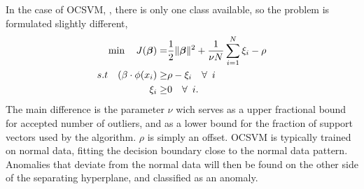             In the case of OCSVM, \cite{Scholkopf2001}, there is only one class available, so the problem is formulated slightly different,
            \begin{align}
                \min \quad J(\bm \beta) = & \frac{1}{2}\lVert\bm \beta\rVert^2  + \frac{1}{\nu N}\sum_{i=1}^N \xi_i - \rho \nonumber \\
                s.t \quad (\beta \cdot \phi(x_i) \geq & \rho - \xi_i \quad \forall \enspace i \nonumber \\
                \xi_i \geq & 0 \quad \forall \enspace i.
                \label{svm:cost_oc}
            \end{align}
            The main difference is the parameter $\nu$ wich serves as a upper fractional bound for accepted number of outliers, and as a lower bound for the fraction of support vectors used by the algorithm. $\rho$ is simply an offset. OCSVM is typically trained on normal data, fitting the decision boundary close to the normal data pattern. Anomalies that deviate from the normal data will then be found on the other side of the separating hyperplane, and classified as an anomaly.    
            
        
    
        
